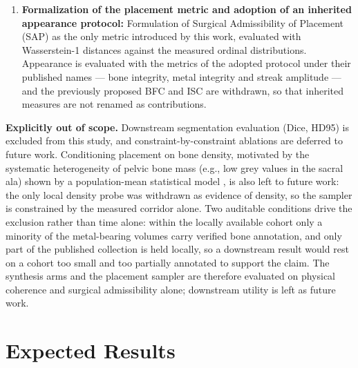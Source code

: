 \documentclass[9pt]{extarticle}
\begin{document}
\begin{enumerate}
subsequent amendments (retraining, checkpoint selection and margin) were fixed on validation patients and by rules recorded before those results were seen. Saturation of the synthesizer with 39 training cases is not claimed: the effect of adding patients was not measured.
  \item \textbf{Formalization of the placement metric and adoption of an inherited appearance protocol:} Formulation of Surgical Admissibility of Placement (SAP) as the only metric introduced by this work, evaluated with Wasserstein-1 distances against the measured ordinal distributions. Appearance is evaluated with the metrics of the adopted protocol under their published names --- bone integrity, metal integrity and streak amplitude \citep{peters2025hybrid} --- and the previously proposed BFC and ISC are withdrawn, so that inherited measures are not renamed as contributions.
\end{enumerate}

\textbf{Explicitly out of scope.} Downstream segmentation evaluation (Dice, HD95) is excluded from this study, and constraint-by-constraint ablations are deferred to future work. Conditioning placement on bone density, motivated by the systematic heterogeneity of pelvic bone mass (e.g., low grey values in the sacral ala) shown by a population-mean statistical model \citep{arand2019pelvicring}, is also left to future work: the only local density probe was withdrawn as evidence of density, so the sampler is constrained by the measured corridor alone. Two auditable conditions drive the exclusion rather than time alone: within the locally available cohort only a minority of the metal-bearing volumes carry verified bone annotation, and only part of the published collection is held locally, so a downstream result would rest on a cohort too small and too partially annotated to support the claim. The synthesis arms and the placement sampler are therefore evaluated on physical coherence and surgical admissibility alone; downstream utility is left as future work.

\section{Expected Results}
\end{document}
